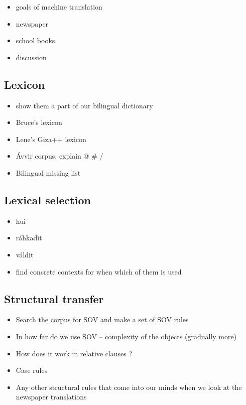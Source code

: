 \documentclass[a4paper,english,12pt]{article}
\begin{document}
\begin{itemize}
\item goals of machine translation
\item newspaper 
\item school books
\item discussion
\end{itemize}

\subsection{Lexicon}
\begin{itemize}
\item show them a part of our bilingual dictionary
\item Bruce's lexicon
\item Lene's Giza++ lexicon
\item Ávvir corpus, explain @ \# /
\item Bilingual missing list
\end{itemize}

\subsection{Lexical selection}
\begin{itemize}
\item hui
\item ráhkadit
\item váldit
\item find concrete contexts for when which of them is used
\end{itemize}

\subsection{Structural transfer} 

\begin{itemize}
  \item Search the corpus for SOV and make a set of SOV rules
  \item In how far do we use SOV -- complexity of the objects (gradually more)
  \item How does it work in relative clauses ?
  \item Case rules
  \item Any other structural rules that come into our minds when we look at the newspaper translations
\end{itemize}
\end{document}
